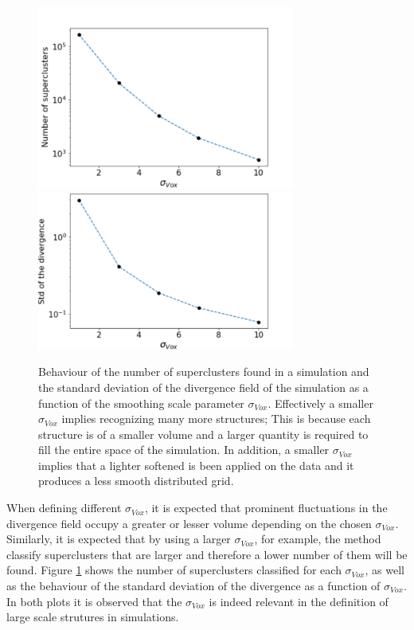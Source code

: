 \documentclass[usenatbib]{mnras}
\begin{document}
\begin{figure}
    \centering
    \includegraphics[width=240pt]{num_superclusters.pdf}
    \includegraphics[width=240pt]{std_smooth.pdf}
    \caption{Behaviour of the number of superclusters found in a simulation and the standard deviation of the divergence field of the simulation as a function of the smoothing scale parameter $\sigma_{Vox}$. Effectively a smaller $\sigma_{Vox}$ implies recognizing many more structures; This is because each structure is of a smaller volume and a larger quantity is required to fill the entire space of the simulation. In addition, a smaller $\sigma_{Vox}$ implies that a lighter softened is been applied on the data and it produces a less smooth distributed grid.}
    \label{fig:Nclusters}
\end{figure}

When defining different $\sigma_{Vox}$, it is expected that prominent fluctuations in the divergence field occupy a greater or lesser volume depending on the chosen $\sigma_{Vox}$. Similarly, it is expected that by using a larger $\sigma_{Vox}$, for example, the method classify superclusters that are larger and therefore a lower number of them will be found. Figure \ref{fig:Nclusters} shows the number of superclusters classified for each $\sigma_{Vox}$, as  well as the behaviour of the standard deviation of the divergence as a function of $\sigma_{Vox}$. In both plots it is observed that the $\sigma_{Vox}$ is indeed relevant in the definition of large scale strutures in simulations.
\end{document}
